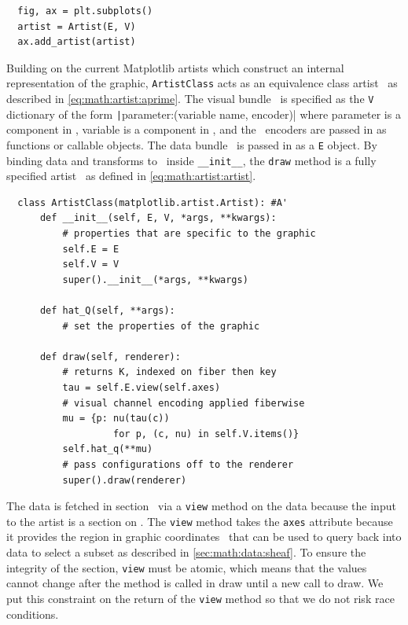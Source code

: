 \documentclass[journal]{vgtc}                %
\begin{document}
\begin{verbatim}
  fig, ax = plt.subplots()
  artist = Artist(E, V)
  ax.add_artist(artist)
\end{verbatim}
Building on the current Matplotlib artists which construct an internal representation of the graphic, \texttt{ArtistClass} acts as an equivalence class artist \vartisteq\ as described in \autoref{eq:math:artist:aprime}. The visual bundle \vtotal\ is specified as the \texttt{V} dictionary of the form \texttt|{parameter:(variable name, encoder)}| where parameter is a component in \vfiber, variable is a component in \dfiber, and the \vchannel\ encoders are passed in as functions or callable objects. The data bundle \dtotal\ is passed in as a \texttt{E} object. By binding data and transforms to \vartisteq\ inside \texttt{__init__}, the \texttt{draw} method is a fully specified artist \vartist\ as defined in \autoref{eq:math:artist:artist}.
\begin{verbatim}
  class ArtistClass(matplotlib.artist.Artist): #A'
      def __init__(self, E, V, *args, **kwargs):
          # properties that are specific to the graphic
          self.E = E
          self.V = V 
          super().__init__(*args, **kwargs)
  
      def hat_Q(self, **args): 
          # set the properties of the graphic
  
      def draw(self, renderer):
          # returns K, indexed on fiber then key 
          tau = self.E.view(self.axes) 
          # visual channel encoding applied fiberwise 
          mu = {p: nu(tau(c))
                   for p, (c, nu) in self.V.items()} 
          self.hat_q(**mu)
          # pass configurations off to the renderer
          super().draw(renderer)
  \end{verbatim}
 The data is fetched in section \dsection\ via a \texttt{view} method on the data because the input to the artist is a section on \dtotal. The \texttt{view} method takes the \texttt{axes} attribute because it provides the region in graphic coordinates \gbase\ that can be used to query back into data to select a subset as described in \autoref{sec:math:data:sheaf}. To ensure the integrity of the section, \texttt{view} must be atomic, which means that the values cannot change after the method is called in draw until a new call to draw. We put this constraint on the return of the \texttt{view} method so that we do not risk race conditions. 
 
\end{document}
